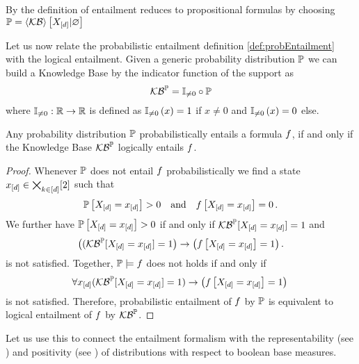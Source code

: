 %
By  the definition of entailment reduces to propositional formulas by choosing $\mathbb{P}=\left\langle \mathcal{KB}\right\rangle \left[ X_{[d]} | \varnothing \right]$



Let us now relate the probabilistic entailment definition \ref{def:probEntailment} with the logical entailment.
Given a generic probability distribution $\mathbb{P}$ we can build a Knowledge Base by the indicator function of the support as 
	\[ \mathcal{KB}^{\mathbb{P}} = \mathbb{I}_{\neq0} \circ \mathbb{P} \]
where $\mathbb{I}_{\neq0}:\mathbb{R}\rightarrow \mathbb{R}$ is defined as $\mathbb{I}_{\neq0}\left(x\right)=1$ if $x\neq0$ and $\mathbb{I}_{\neq0}\left(x\right)=0$ else.

\begin{theorem}\label{the:entailmentProbToLogical}
	Any probability distribution $\mathbb{P}$ probabilistically entails a formula $f$, if and only if the Knowledge Base $\mathcal{KB}^{\mathbb{P}}$ logically entails $f$.
\end{theorem}
\begin{proof}
	Whenever $\mathbb{P}$ does not entail $f$ probabilistically we find a state $x_{[d]}\in\bigtimes_{k\in[d]}[2]$ such that
		\[ \mathbb{P}\left[X_{[d]}=x_{[d]}\right] >0 \quad\text{and} \quad f\left[X_{[d]}=x_{[d]}\right] = 0 \, . \]
	We further have $\mathbb{P}\left[X_{[d]}=x_{[d]}\right] >0$ if and only if $\mathcal{KB}^{\mathbb{P}}[X_{[d]}=x_{[d]}]=1$ and
		\[ \big((\mathcal{KB}^{\mathbb{P}}[X_{[d]}=x_{[d]}]=1\big) \rightarrow \big(f\left[X_{[d]}=x_{[d]}\right]=1\big) \, . \]
	is not satisfied.
	Together, $\mathbb{P}\models f$ does not holds if and only if
		\[ \forall x_{[d]} (\mathcal{KB}^{\mathbb{P}}[X_{[d]}=x_{[d]}]=1) \rightarrow \big(f\left[X_{[d]}=x_{[d]}\right]=1\big) \,  \]
	is not satisfied. 
	Therefore, probabilistic entailment of $f$ by $\mathbb{P}$ is equivalent to logical entailment of $f$ by $\mathcal{KB}^{\mathbb{P}}$.
\end{proof}

Let us use this to connect the entailment formalism with the representability (see ) and positivity (see ) of distributions with respect to boolean base measures.

